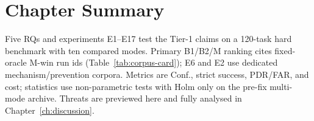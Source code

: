 \section*{Chapter Summary}

Five RQs and experiments E1--E17 test the Tier-1 claims on a 120-task hard
benchmark with ten compared modes.
Primary B1/B2/M ranking cites fixed-oracle M-win run ids
(Table~\ref{tab:corpus-card}); E6 and E2 use dedicated mechanism/prevention
corpora.
Metrics are Conf., strict success, PDR/FAR, and cost; statistics use
non-parametric tests with Holm only on the pre-fix multi-mode archive.
Threats are previewed here and fully analysed in Chapter~\ref{ch:discussion}.
